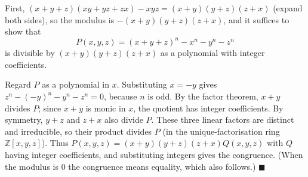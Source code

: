 First, $(x+y+z)(xy+yz+zx)-xyz=(x+y)(y+z)(z+x)$ (expand both sides), so the modulus is $-(x+y)(y+z)(z+x)$, and it suffices to show that
\[P(x,y,z)=(x+y+z)^n-x^n-y^n-z^n\]
is divisible by $(x+y)(y+z)(z+x)$ as a polynomial with integer coefficients.

Regard $P$ as a polynomial in $x$. Substituting $x=-y$ gives $z^n-(-y)^n-y^n-z^n=0$, because $n$ is odd. By the factor theorem, $x+y$ divides $P$; since $x+y$ is monic in $x$, the quotient has integer coefficients. By symmetry, $y+z$ and $z+x$ also divide $P$. These three linear factors are distinct and irreducible, so their product divides $P$ (in the unique-factorisation ring $\mathbb{Z}[x,y,z]$). Thus $P(x,y,z)=(x+y)(y+z)(z+x)Q(x,y,z)$ with $Q$ having integer coefficients, and substituting integers gives the congruence. (When the modulus is $0$ the congruence means equality, which also follows.) $\blacksquare$
